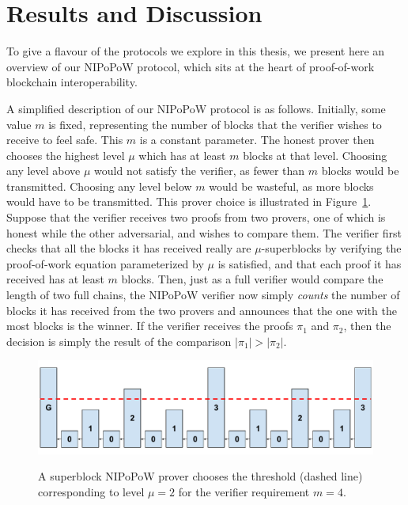 \section{Results and Discussion}

To give a flavour of the protocols we explore in this thesis, we present here
an overview of our NIPoPoW protocol, which sits at the heart of proof-of-work
blockchain interoperability.

A simplified description of our NIPoPoW protocol is as follows. Initially, some value
$m$ is fixed, representing the number of blocks that the verifier wishes to
receive to feel safe. This $m$ is a constant parameter. The honest prover then
chooses the highest level $\mu$ which has at least $m$ blocks at that level.
Choosing any level above $\mu$ would not satisfy the verifier, as fewer than $m$
blocks would be transmitted. Choosing any level below $m$ would be wasteful, as
more blocks would have to be transmitted. This prover choice is illustrated in
Figure~\ref{fig.level-threshold}. Suppose that the verifier receives two
proofs from two provers, one of which is honest while the other adversarial, and
wishes to compare them. The verifier first checks that all the blocks it has
received really are $\mu$-superblocks by verifying the proof-of-work equation
parameterized by $\mu$ is satisfied, and that each proof it has received has at
least $m$ blocks. Then, just as a full verifier would compare the length of two
full chains, the NIPoPoW verifier now simply \emph{counts} the number of blocks
it has received from the two provers and announces that the one with the most
blocks is the winner. If the verifier receives the proofs $\pi_1$ and $\pi_2$,
then the decision is simply the result of the comparison $|\pi_1| > |\pi_2|$.

\begin{figure}[ht]
    \caption{A superblock NIPoPoW prover chooses the threshold (dashed line)
    corresponding to level $\mu = 2$ for the verifier requirement $m = 4$.}
    \centering
    \includegraphics[width=0.7\columnwidth,keepaspectratio]{../chapters/introduction/figures/level-threshold.pdf}
    \label{fig.level-threshold}
\end{figure}

